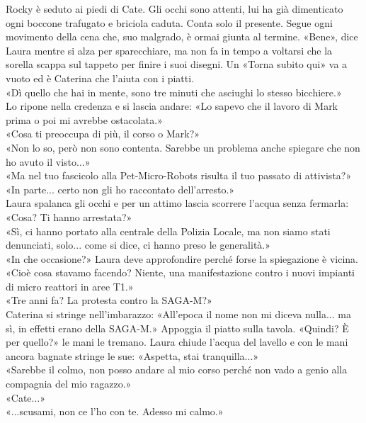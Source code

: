 \documentclass[10pt,oneside]{extbook}
\begin{document}
\par\medskip
Rocky \`e seduto ai piedi di Cate. Gli occhi sono attenti, lui ha gi\`a dimenticato ogni boccone trafugato e briciola caduta. Conta solo il presente.  Segue ogni movimento della cena che, suo malgrado, \`e ormai giunta al termine.
«Bene», dice Laura mentre si alza per sparecchiare, ma non fa in tempo a voltarsi che la sorella  scappa sul tappeto per finire i suoi disegni. Un  «Torna subito qui» va a vuoto ed \`e Caterina che l'aiuta con i piatti.\\
«Dì quello che hai in mente, sono tre minuti che asciughi lo stesso bicchiere.»\\
Lo ripone nella credenza e si lascia andare: «Lo sapevo che il lavoro di Mark prima o poi mi avrebbe ostacolata.»\\
«Cosa ti preoccupa di pi\`u, il corso o Mark?»\\
«Non lo so, per\`o non sono contenta. Sarebbe un problema anche spiegare che non ho avuto il visto...»\\
«Ma nel tuo fascicolo alla Pet-Micro-Robots risulta il tuo passato di attivista?»\\
«In parte... certo non gli ho raccontato dell'arresto.»\\
Laura spalanca gli occhi e per un attimo lascia scorrere l'acqua senza fermarla: «Cosa? Ti hanno arrestata?»\\
«Sì, ci hanno portato alla centrale della Polizia Locale, ma non siamo stati denunciati, solo... come si dice, ci hanno preso le generalità.»\\
«In che occasione?» Laura deve approfondire perch\'e forse la spiegazione \`e vicina.\\
«Cio\`e cosa stavamo facendo? Niente, una manifestazione contro i nuovi impianti di micro reattori in aree T1.»\\
«Tre anni fa? La protesta contro la SAGA-M?»\\
Caterina si stringe nell'imbarazzo: «All'epoca il nome non mi diceva nulla... ma sì, in effetti erano della SAGA-M.» Appoggia il piatto sulla tavola. «Quindi? \`E per quello?» le mani le tremano.
Laura chiude l'acqua del lavello e con le mani ancora bagnate stringe le sue: «Aspetta, stai tranquilla...»\\
«Sarebbe il colmo, non posso andare al mio corso perch\'e non vado a genio alla compagnia del mio ragazzo.»\\
«Cate...»\\
«...scusami, non ce l'ho con te. Adesso mi calmo.»\\
\end{document}
